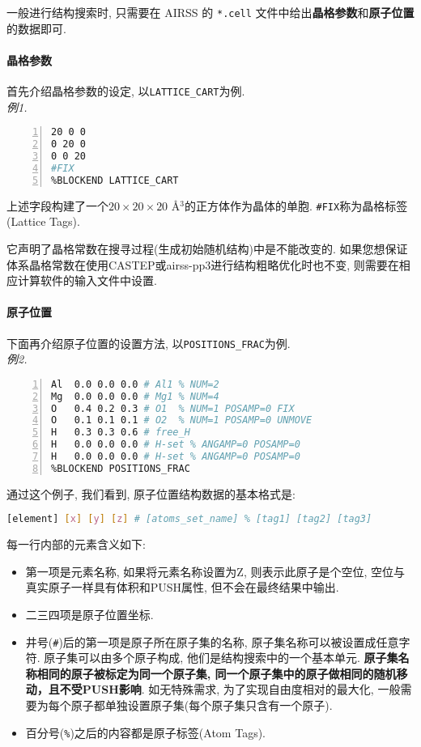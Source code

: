 \documentclass[a4paper, 10pt]{article}
\begin{document}
一般进行结构搜索时, 只需要在 AIRSS 的 \verb|*.cell| 文件中给出\textbf{晶格参数}和\textbf{原子位置}的数据即可.

\paragraph{晶格参数} 首先介绍晶格参数的设定, 以\verb|LATTICE_CART|为例.\\
\emph{例1.}
\begin{lstlisting}[language={bash},numbers=left]
%BLOCK LATTICE_CART
20 0 0
0 20 0
0 0 20
#FIX
%BLOCKEND LATTICE_CART
\end{lstlisting}

上述字段构建了一个\(20\times20\times20\) \r{A}\(^3\)的正方体作为晶体的单胞. \verb|#FIX|称为晶格标签(Lattice Tags). 

它声明了晶格常数在搜寻过程(生成初始随机结构)中是不能改变的. 如果您想保证体系晶格常数在使用CASTEP或airss-pp3进行结构粗略优化时也不变, 则需要在相应计算软件的输入文件中设置.

\paragraph{原子位置} 下面再介绍原子位置的设置方法, 以\verb|POSITIONS_FRAC|为例.\\
\emph{例2.}
\hypertarget{Aotic Package}{\ }
\begin{lstlisting}[language={bash},numbers=left]
%BLOCK POSITIONS_FRAC
Al  0.0 0.0 0.0 # Al1 % NUM=2 
Mg  0.0 0.0 0.0 # Mg1 % NUM=4 
O   0.4 0.2 0.3 # O1  % NUM=1 POSAMP=0 FIX
O   0.1 0.1 0.1 # O2  % NUM=1 POSAMP=0 UNMOVE
H   0.3 0.3 0.6 # free_H 
H   0.0 0.0 0.0 # H-set % ANGAMP=0 POSAMP=0
H   0.0 0.0 0.0 # H-set % ANGAMP=0 POSAMP=0
%BLOCKEND POSITIONS_FRAC
\end{lstlisting}

通过这个例子, 我们看到, 原子位置结构数据的基本格式是:
\begin{lstlisting}[language={bash}]
[element] [x] [y] [z] # [atoms_set_name] % [tag1] [tag2] [tag3]
\end{lstlisting}

每一行内部的元素含义如下: 
\begin{itemize}
  \item 第一项是元素名称, 如果将元素名称设置为Z, 则表示此原子是个空位, 空位与真实原子一样具有体积和PUSH属性, 但不会在最终结果中输出.
  \item 二三四项是原子位置坐标.
  \item 井号(\verb|#|)后的第一项是原子所在原子集的名称, 原子集名称可以被设置成任意字符. 原子集可以由多个原子构成, 他们是结构搜索中的一个基本单元. \textbf{原子集名称相同的原子被标定为同一个原子集, 同一个原子集中的原子做相同的随机移动，且不受PUSH影响}. 如无特殊需求, 为了实现自由度相对的最大化, 一般需要为每个原子都单独设置原子集(每个原子集只含有一个原子).
  \item 百分号(\verb|%|)之后的内容都是原子标签(Atom Tags).
\end{itemize}
\end{document}
